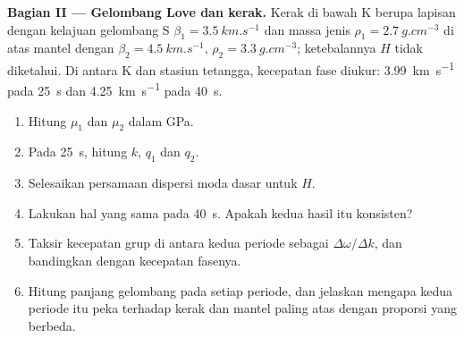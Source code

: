 \begin{problem}
\noindent\textbf{Bagian II --- Gelombang Love dan kerak.} Kerak di bawah K berupa
lapisan dengan kelajuan gelombang S $\beta_1 = \qty{3.5}{km.s^{-1}}$ dan massa jenis
$\rho_1 = \qty{2.7}{g.cm^{-3}}$ di atas mantel dengan $\beta_2 =
\qty{4.5}{km.s^{-1}}$, $\rho_2 = \qty{3.3}{g.cm^{-3}}$; ketebalannya $H$ tidak
diketahui. Di antara K dan stasiun tetangga, kecepatan fase 
diukur: \qty{3.99}{km.s^{-1}} pada \qty{25}{s} dan \qty{4.25}{km.s^{-1}} pada
\qty{40}{s}.
\begin{enumerate}[resume]
  \item Hitung $\mu_1$ dan $\mu_2$ dalam \unit{GPa}.
  \item Pada \qty{25}{s}, hitung $k$, $q_1$ dan $q_2$.
  \item Selesaikan persamaan dispersi moda dasar untuk $H$.
  \item Lakukan hal yang sama pada \qty{40}{s}. Apakah kedua hasil itu konsisten?
  \item Taksir kecepatan grup di antara kedua periode sebagai
        $\Delta\omega/\Delta k$, dan bandingkan dengan kecepatan fasenya.
  \item Hitung panjang gelombang pada setiap periode, dan jelaskan mengapa kedua
        periode itu peka terhadap kerak dan mantel paling atas dengan
        proporsi yang berbeda.
\end{enumerate}


\end{problem}
